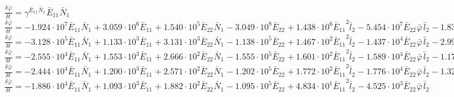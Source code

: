 $\frac{{\delta}^{} {\bar{\varphi}}_{}}{{\delta} {{{t}}_{}}^{}} = {\gamma}^{{{{\bar{E}}_{11}}^{}{{\bar{N}}_{1}}^{}}}{{{\bar{E}}_{11}}^{}{{\bar{N}}_{1}}^{}}$
$\frac{{\delta}^{} {\bar{\varphi}}_{}}{{\delta} {{{t}}_{}}^{}} = -1.924\cdot 10^{7}{{{\bar{E}}_{11}}^{}{{\bar{N}}_{1}}^{}} + 3.059\cdot 10^{6}{{{\bar{E}}_{11}}^{}} + 1.540\cdot 10^{5}{{{\bar{E}}_{22}}^{}{{\bar{N}}_{1}}^{}} - 3.049\cdot 10^{8}{{{\bar{E}}_{22}}^{}} + 1.438\cdot 10^{6}{{{\bar{E}}_{11}}^{2}{{\bar{l}}_{2}}^{}} - 5.454\cdot 10^{7}{{{\bar{E}}_{22}}^{}{{\bar{\varphi}}_{}}^{}{{\bar{l}}_{2}}^{}} - 1.831\cdot 10^{7}{{{\bar{E}}_{11}}^{}{{\bar{E}}_{22}}^{}{{\bar{N}}_{1}}^{}} - 6.732\cdot 10^{3}{{{\bar{E}}_{12}}^{2}{{\bar{N}}_{1}}^{}} + 3.512\cdot 10^{5}{{{\bar{E}}_{11}}^{2}{{\bar{N}}_{1}}^{}} - 9.942\cdot 10^{7}{{{\bar{E}}_{11}}^{2}}$
$\frac{{\delta}^{} {\bar{\varphi}}_{}}{{\delta} {{{t}}_{}}^{}} = -3.128\cdot 10^{5}{{{\bar{E}}_{11}}^{}{{\bar{N}}_{1}}^{}} + 1.133\cdot 10^{3}{{{\bar{E}}_{11}}^{}} + 3.131\cdot 10^{3}{{{\bar{E}}_{22}}^{}{{\bar{N}}_{1}}^{}} - 1.138\cdot 10^{5}{{{\bar{E}}_{22}}^{}} + 1.467\cdot 10^{2}{{{\bar{E}}_{11}}^{2}{{\bar{l}}_{2}}^{}} - 1.437\cdot 10^{4}{{{\bar{E}}_{22}}^{}{{\bar{\varphi}}_{}}^{}{{\bar{l}}_{2}}^{}} - 2.993\cdot 10^{5}{{{\bar{E}}_{11}}^{}{{\bar{E}}_{22}}^{}{{\bar{N}}_{1}}^{}} - 5.465\cdot 10^{1}{{{\bar{E}}_{12}}^{2}{{\bar{N}}_{1}}^{}} + 2.990\cdot 10^{3}{{{\bar{E}}_{11}}^{2}{{\bar{N}}_{1}}^{}}$
$\frac{{\delta}^{} {\bar{\varphi}}_{}}{{\delta} {{{t}}_{}}^{}} = -2.555\cdot 10^{4}{{{\bar{E}}_{11}}^{}{{\bar{N}}_{1}}^{}} + 1.553\cdot 10^{3}{{{\bar{E}}_{11}}^{}} + 2.666\cdot 10^{2}{{{\bar{E}}_{22}}^{}{{\bar{N}}_{1}}^{}} - 1.555\cdot 10^{5}{{{\bar{E}}_{22}}^{}} + 1.601\cdot 10^{2}{{{\bar{E}}_{11}}^{2}{{\bar{l}}_{2}}^{}} - 1.589\cdot 10^{4}{{{\bar{E}}_{22}}^{}{{\bar{\varphi}}_{}}^{}{{\bar{l}}_{2}}^{}} - 1.173\cdot 10^{3}{{{\bar{E}}_{11}}^{}{{\bar{E}}_{22}}^{}{{\bar{N}}_{1}}^{}} - 3.107\cdot 10^{1}{{{\bar{E}}_{12}}^{2}{{\bar{N}}_{1}}^{}}$
$\frac{{\delta}^{} {\bar{\varphi}}_{}}{{\delta} {{{t}}_{}}^{}} = -2.444\cdot 10^{4}{{{\bar{E}}_{11}}^{}{{\bar{N}}_{1}}^{}} + 1.200\cdot 10^{3}{{{\bar{E}}_{11}}^{}} + 2.571\cdot 10^{2}{{{\bar{E}}_{22}}^{}{{\bar{N}}_{1}}^{}} - 1.202\cdot 10^{5}{{{\bar{E}}_{22}}^{}} + 1.772\cdot 10^{2}{{{\bar{E}}_{11}}^{2}{{\bar{l}}_{2}}^{}} - 1.776\cdot 10^{4}{{{\bar{E}}_{22}}^{}{{\bar{\varphi}}_{}}^{}{{\bar{l}}_{2}}^{}} - 1.326\cdot 10^{3}{{{\bar{E}}_{11}}^{}{{\bar{E}}_{22}}^{}{{\bar{N}}_{1}}^{}}$
$\frac{{\delta}^{} {\bar{\varphi}}_{}}{{\delta} {{{t}}_{}}^{}} = -1.886\cdot 10^{4}{{{\bar{E}}_{11}}^{}{{\bar{N}}_{1}}^{}} + 1.093\cdot 10^{3}{{{\bar{E}}_{11}}^{}} + 1.882\cdot 10^{2}{{{\bar{E}}_{22}}^{}{{\bar{N}}_{1}}^{}} - 1.095\cdot 10^{5}{{{\bar{E}}_{22}}^{}} + 4.834\cdot 10^{1}{{{\bar{E}}_{11}}^{2}{{\bar{l}}_{2}}^{}} - 4.525\cdot 10^{3}{{{\bar{E}}_{22}}^{}{{\bar{\varphi}}_{}}^{}{{\bar{l}}_{2}}^{}}$
